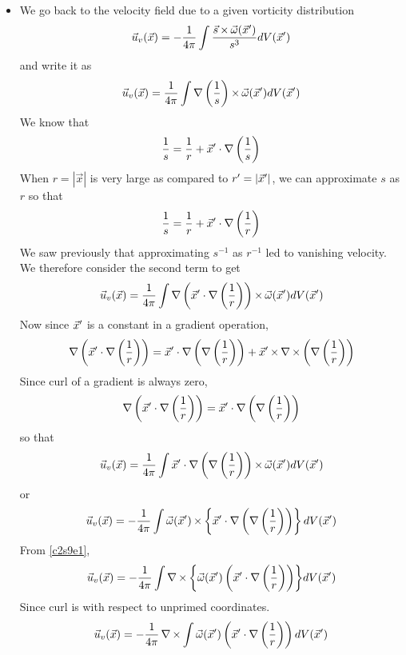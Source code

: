 \begin{itemize}
\item We go back to the velocity field due to a given vorticity distribution
\[
\vec{u}_v(\vec{x}) = -\frac{1}{4\pi}\int\frac{\vec{s}\operatorname{\times}\vec{\omega}(\vec{x}^\prime)}{s^3} dV(\vec{x}^\prime)
\]
and write it as
\[
\vec{u}_v(\vec{x}) = \frac{1}{4\pi}\int\operatorname{\nabla}{\left(\frac{1}{s}\right)}\operatorname{\times}\vec{\omega}(\vec{x}^\prime) dV(\vec{x}^\prime)
\]
We know that
\[
\frac{1}{s} = \frac{1}{r} + \vec{x}^\prime\cdot\operatorname{\nabla}{\left(\frac{1}{s}\right)}
\]
When $r = |\vec{x}|$ is very large as compared to $r^\prime = |\vec{x}^\prime|$, we can approximate $s$ as $r$ so that
\[
\frac{1}{s} = \frac{1}{r} + \vec{x}^\prime\cdot\operatorname{\nabla}{\left(\frac{1}{r}\right)}
\]
We saw previously that approximating $s^{-1}$ as $r^{-1}$ led to vanishing velocity. We therefore consider the second term to get
\[
\vec{u}_v(\vec{x}) = \frac{1}{4\pi}\int\operatorname{\nabla}{\left(\vec{x}^\prime\cdot\operatorname{\nabla}{\left(\frac{1}{r}\right)}\right)}\operatorname{\times}\vec{\omega}(\vec{x}^\prime) dV(\vec{x}^\prime)
\]
Now since $\vec{x}^\prime$ is a constant in a gradient operation,
\[
\operatorname{\nabla}{\left(\vec{x}^\prime\cdot\operatorname{\nabla}{\left(\frac{1}{r}\right)}\right)} = \vec{x}^\prime\cdot\operatorname{\nabla}{\left(\operatorname{\nabla}{\left(\frac{1}{r}\right)}\right)} + 
\vec{x}^\prime\operatorname{\times}\operatorname{\nabla\operatorname{\times}}{\left(\operatorname{\nabla}{\left(\frac{1}{r}\right)}\right)}
\]
Since curl of a gradient is always zero,
\[
\operatorname{\nabla}{\left(\vec{x}^\prime\cdot\operatorname{\nabla}{\left(\frac{1}{r}\right)}\right)} = \vec{x}^\prime\cdot\operatorname{\nabla}{\left(\operatorname{\nabla}{\left(\frac{1}{r}\right)}\right)} 
\]
so that
\[
\vec{u}_v(\vec{x}) = \frac{1}{4\pi}\int\vec{x}^\prime\cdot\operatorname{\nabla}{\left(\operatorname{\nabla}{\left(\frac{1}{r}\right)}\right)}\operatorname{\times}\vec{\omega}(\vec{x}^\prime) dV(\vec{x}^\prime)
\]
or
\[
\vec{u}_v(\vec{x}) = -\frac{1}{4\pi}\int\vec{\omega}(\vec{x}^\prime)\operatorname{\times}\left\{\vec{x}^\prime\cdot\operatorname{\nabla}{\left(\operatorname{\nabla}{\left(\frac{1}{r}\right)}\right)}\right\}dV(\vec{x}^\prime)
\]
From \eqref{c2s9e1},
\[
\vec{u}_v(\vec{x}) = -\frac{1}{4\pi}\int\operatorname{\nabla\operatorname{\times}}{\left\{\vec{\omega}(\vec{x}^\prime)\left(\vec{x}^\prime\cdot\operatorname{\nabla}{\left(\frac{1}{r}\right)}\right)\right\}}dV(\vec{x}^\prime)
\] 
Since curl is with respect to unprimed coordinates.
\begin{equation}\label{c2s9e2}
\vec{u}_v(\vec{x}) = -\frac{1}{4\pi}\operatorname{\nabla\operatorname{\times}}\int \vec{\omega}(\vec{x}^\prime) \left(\vec{x}^\prime\cdot\operatorname{\nabla}{\left(\frac{1}{r}\right)}\right) dV(\vec{x}^\prime)
\end{equation}


\end{itemize}
